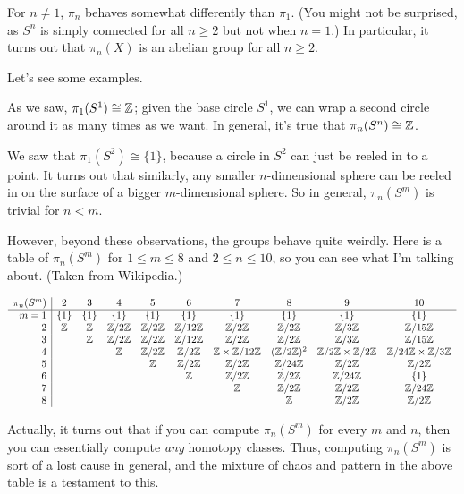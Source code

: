 For $n \neq 1$, $\pi_n$ behaves somewhat differently than $\pi_1$.
(You might not be surprised, as $S^n$ is simply connected for all $n \ge 2$ but not when $n=1$.)
In particular, it turns out that $\pi_n(X)$ is an abelian group for all $n \ge 2$.

Let's see some examples.
\begin{example}
	As we saw, $\pi_1(S^1) \cong \mathbb Z$; given the base circle $S^1$,
	we can wrap a second circle around it as many times as we want.
	In general, it's true that $\pi_n(S^n) \cong \mathbb Z$.
\end{example}
\begin{example}
	We saw that $\pi_1(S^2) \cong \{1\}$, because
	a circle in $S^2$ can just be reeled in to a point.
	It turns out that similarly, any smaller $n$-dimensional sphere
	can be reeled in on the surface of a bigger $m$-dimensional sphere.
	So in general, $\pi_n(S^m)$ is trivial for $n < m$.
\end{example}
However, beyond these observations, the groups behave quite weirdly.
Here is a table of $\pi_n(S^m)$ for $1 \le m \le 8$ and $2 \le n \le 10$,
so you can see what I'm talking about.
(Taken from Wikipedia.)

\bgroup
\footnotesize
\[
	\begin{array}{r|ccccccccc}
		\pi_n(S^m) & 2 & 3 & 4 & 5 & 6 & 7 & 8 & 9 & 10 \\ \hline
		m = 1 & \{1\} & \{1\} & \{1\} & \{1\} & \{1\} & \{1\} & \{1\} & \{1\} & \{1\} \\
		2 &  \mathbb Z & \mathbb Z & \mathbb Z/2\mathbb Z & \mathbb Z/2\mathbb Z & \mathbb Z/12\mathbb Z & \mathbb Z/2\mathbb Z & \mathbb Z/2\mathbb Z & \mathbb Z/3\mathbb Z & \mathbb Z/15\mathbb Z\\
		3 & & \mathbb Z & \mathbb Z/2\mathbb Z & \mathbb Z/2\mathbb Z & \mathbb Z/12\mathbb Z & \mathbb Z/2\mathbb Z & \mathbb Z/2\mathbb Z & \mathbb Z/3\mathbb Z & \mathbb Z/15\mathbb Z\\
		4 & &  & \mathbb Z & \mathbb Z/2\mathbb Z & \mathbb Z/2\mathbb Z & \mathbb Z \times \mathbb Z/12\mathbb Z & (\mathbb Z/2\mathbb Z)^2 & \mathbb Z/2\mathbb Z \times \mathbb Z/2\mathbb Z & \mathbb Z/24\mathbb Z \times \mathbb Z/3\mathbb Z \\
		5 & &  &  & \mathbb Z & \mathbb Z/2\mathbb Z & \mathbb Z/2\mathbb Z & \mathbb Z/24\mathbb Z & \mathbb Z/2\mathbb Z & \mathbb Z/2\mathbb Z \\
		6 & &  &  &  & \mathbb Z & \mathbb Z/2\mathbb Z & \mathbb Z/2\mathbb Z & \mathbb Z/24\mathbb Z & \{1\} \\
		7 & &  &  &  &  & \mathbb Z & \mathbb Z/2\mathbb Z & \mathbb Z/2\mathbb Z & \mathbb Z/24\mathbb Z \\
		8 & &  &  &  &  &  & \mathbb Z & \mathbb Z/2\mathbb Z & \mathbb Z/2\mathbb Z
	\end{array}
\]
\egroup

Actually, it turns out that if you can compute $\pi_n(S^m)$
for every $m$ and $n$,
then you can essentially compute \emph{any} homotopy classes.
Thus, computing $\pi_n(S^m)$ is sort of a lost cause in general,
and the mixture of chaos and pattern in the above table is a testament to this.


